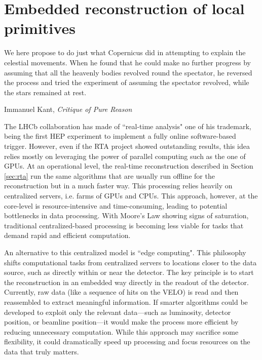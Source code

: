 
\chapter{Embedded reconstruction of local primitives}
\label{chp:retina}
\epigraph{We here propose to do just what Copernicus did in attempting to explain the celestial movements. When he found that he could make no further progress by assuming that all the heavenly bodies revolved round the spectator, he reversed the process and tried the experiment of assuming the spectator revolved, while the stars remained at rest.}{Immanuel Kant, \textit{Critique of Pure Reason}}

The LHCb collaboration has made of ``real-time analysis" one of his trademark, being the first HEP experiment to implement a fully online software-based trigger. However, even if the RTA project showed outstanding results, this idea relies mostly on leveraging the power of parallel computing such as the one of GPUs. 
At an operational level, the real-time reconstruction described in Section \ref{sec:rta} run the same algorithms that are usually run offline for the reconstruction but in a much faster way. This processing relies heavily on centralized servers, i.e. farms of GPUs and CPUs. This approach, however, at the core-level is resource-intensive and time-consuming, leading to potential bottlenecks in data processing. With Moore's Law showing signs of saturation, traditional centralized-based processing is becoming less viable for tasks that demand rapid and efficient computation.

An alternative to this centralized model is ``edge computing". This philosophy shifts computational tasks from centralized servers to locations closer to the data source, such as directly within or near the detector. The key principle is to start the reconstruction in an embedded way directly in the readout of the detector. Currently, raw data (like a sequence of hits on the VELO) is read and then reassembled to extract meaningful information\cite{https://doi.org/10.5281/zenodo.8119731}. If smarter algorithms could be developed to exploit only the relevant data—such as luminosity, detector position, or beamline position—it would make the process more efficient by reducing unnecessary computation. While this approach may sacrifice some flexibility, it could dramatically speed up processing and focus resources on the data that truly matters.

